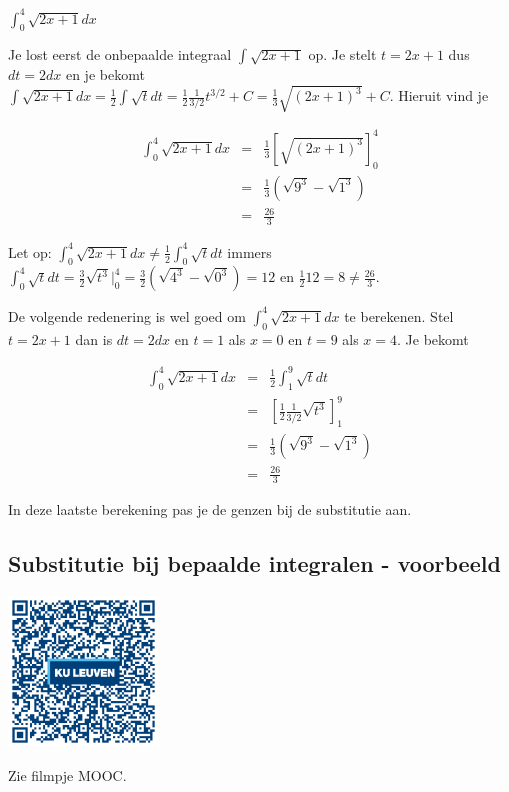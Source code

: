\begin{voorbeeld}
	$\int ^4_0 \sqrt{2x+1}dx$

Je lost eerst de onbepaalde integraal $\int \sqrt{2x+1}$ op.
Je stelt $t=2x+1$ dus $dt=2dx$ en je bekomt $\int \sqrt {2x+1} dx=\frac{1}{2} \int \sqrt {t} dt=\frac {1}{2} \frac{1}{3/2} t^{3/2}+C=\frac{1}{3} \sqrt {(2x+1)^3}+C$.
Hieruit vind je

\begin{eqnarray*}
\int ^4_0 \sqrt {2x+1} dx&=&\frac{1}{3} \left[ \sqrt {(2x+1)^3}\right] ^4_0 \\
&=&\frac{1}{3}\left( \sqrt{9^3} - \sqrt{1^3} \right)\\
&=&\frac{26}{3}
\end{eqnarray*}

Let op: $\int ^4_0 \sqrt {2x+1}dx \neq \frac{1}{2} \int ^4_0 \sqrt {t} dt$ immers $\int ^4_0 \sqrt {t} dt=\frac{3}{2}\sqrt {t^3}\vert ^4_0=\frac{3}{2}\left( \sqrt {4^3}-\sqrt {0^3} \right)=12$ en $\frac{1}{2}12=8\neq \frac{26}{3}$.

De volgende redenering is wel goed om $\int ^4_0 \sqrt {2x+1}dx$ te berekenen.
Stel $t=2x+1$ dan is $dt=2dx$ en $t=1$ als $x=0$ en $t=9$ als $x=4$.
Je bekomt

\begin{eqnarray*}
\int ^4_0 \sqrt{2x+1}dx &=& \frac{1}{2} \int ^9_1 \sqrt {t} dt \\
&=& \left[\frac{1}{2} \frac{1}{3/2} \sqrt {t^3} \right] ^9_1 \\
&=&\frac{1}{3} \left( \sqrt{9^3}-\sqrt{1^3} \right) \\
&=&\frac{26}{3}
\end{eqnarray*}

In deze laatste berekening pas je de genzen bij de substitutie aan.

\end{voorbeeld}

\subsection{Substitutie bij bepaalde integralen - voorbeeld}
\begin{minipage}{.25\linewidth}
	\raggedright
	\includegraphics[width=4cm]{6_afgeleiden_integralen/inputs/QR_Code_SUBSTBEPVB_module6_3new}
\end{minipage}
\begin{minipage}{.7\linewidth}
	Zie filmpje MOOC.
\end{minipage}


